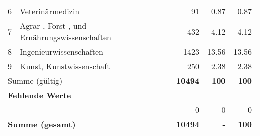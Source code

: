 \begin{longtable}{lXrrr}
     6 &
     \multicolumn{1}{X}{ Veterinärmedizin   } &


       \num{91} &
       \num[round-mode=places,round-precision=2]{0,87} &
         \num[round-mode=places,round-precision=2]{0,87} \\

     7 &
     \multicolumn{1}{X}{ Agrar-, Forst-, und Ernährungswissenschaften   } &


       \num{432} &
       \num[round-mode=places,round-precision=2]{4,12} &
         \num[round-mode=places,round-precision=2]{4,12} \\

     8 &
     \multicolumn{1}{X}{ Ingenieurwissenschaften   } &


       \num{1423} &
       \num[round-mode=places,round-precision=2]{13,56} &
         \num[round-mode=places,round-precision=2]{13,56} \\

     9 &
     \multicolumn{1}{X}{ Kunst, Kunstwissenschaft   } &


       \num{250} &
       \num[round-mode=places,round-precision=2]{2,38} &
         \num[round-mode=places,round-precision=2]{2,38} \\
     \midrule
     \multicolumn{2}{l}{Summe (gültig)} &
       \textbf{\num{10494}} &
     \textbf{100} &
       \textbf{\num[round-mode=places,round-precision=2]{100}} \\
     \multicolumn{5}{l}{\textbf{Fehlende Werte}}\\
      & & 0 & 0 & 0 \\
     \midrule
     \multicolumn{2}{l}{\textbf{Summe (gesamt)}} &
          \textbf{\num{10494}} &
        \textbf{-} &
        \textbf{100} \\
     \bottomrule
     \end{longtable}
     
